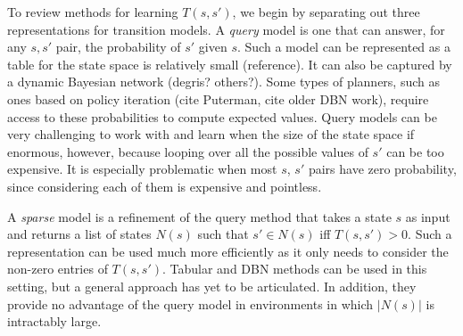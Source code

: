 \documentclass[letterpaper]{article} %
\begin{document}
To review methods for learning $T(s,s')$, we begin by separating out three representations for transition models. A \emph{query}
model is one that can answer, for any $s,s'$ pair, the probability of $s'$ given $s$. Such a model can be represented as a table for the state space is relatively small (reference). It can also be captured by a dynamic Bayesian network (degris? others?).
Some types of planners, such as ones based on policy iteration (cite Puterman, cite older DBN work), require access to these probabilities to compute expected values.
Query models can be very challenging to work with and learn when the size of the state space if enormous, however, because looping over all the possible values of $s'$ can be too expensive. It is especially problematic when most $s$, $s'$ pairs have zero probability, since considering each of them is expensive and pointless.

A \emph{sparse} model is a refinement of the query method that takes a state $s$ as input and returns a list of states $N(s)$ such that $s' \in N(s)$ iff $T(s,s')>0$. Such a representation can be used much more efficiently as it only needs to consider the non-zero entries of $T(s,s')$. Tabular and DBN methods can be used in this setting, but a general approach has yet to be articulated. In addition, they provide no advantage of the query model in environments in which $|N(s)|$ is intractably large.
\end{document}
